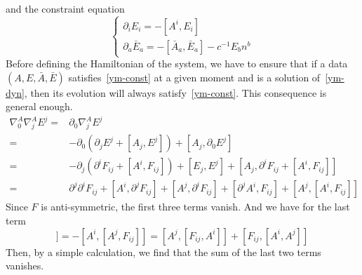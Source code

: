 and the constraint equation
\begin{equation}\label{ym-const}
\begin{cases}
\partial_i E_i  = - [A^i, E_i] \\
\partial_a \bar E_a = - [\bar A_a , \bar E_a]  - c^{-1} E_{b}n^b
\end{cases}
\end{equation}
Before defining the Hamiltonian of the system, we have to ensure that if a data $(A, E, \bar A, \bar E)$ satisfies~\cref{ym-const} at a given moment and is a solution of~\cref{ym-dyn}, then its evolution will always satisfy~\cref{ym-const}.
This consequence is general enough. 
\begin{equation*}
\begin{split}
\nabla^A_0\nabla^A_j E^j = & \partial_0 \nabla^A_j E^j  \\
= & -\partial_0(\partial_j E^j + [A_j , E^j]) + [A_j, \partial_0 E^j] \\
= &- \partial_j (\partial^i F_{ij} + [A^i, F_{ij}]) + [E_j, E^j] + [A_j, \partial^i F_{ij} + [A^i, F_{ij}]] \\
= & \partial^j\partial^i F_{ij}  + [A^i, \partial^j F_{ij}] + [A^j, \partial^i F_{ij}] + [\partial^j A^i, F_{ij}]+ [A^j, [A^i, F_{ij}]]
\end{split}
\end{equation*}
Since $F$ is anti-symmetric, the first three terms vanish. 
And we have for the last term
\begin{equation*}
[A^j, [A^i, F_{ij}]] = - [A^i, [A^j, F_{ij}]]
= [A^j, [F_{ij}, A^i]] + [F_{ij}, [A^i, A^j]]
\end{equation*}
Then, by a simple calculation, we find that the sum of the last two terms vanishes.









